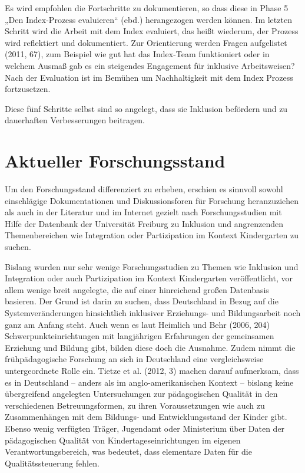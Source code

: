 Es wird empfohlen die Fortschritte zu dokumentieren, so dass diese in Phase 5 „Den Index-Prozess evaluieren“ (ebd.) herangezogen werden können. Im letzten Schritt wird die Arbeit mit dem Index evaluiert, das heißt wiederum, der Prozess wird reflektiert und dokumentiert. Zur Orientierung werden Fragen aufgelistet (2011, 67), zum Beispiel wie gut hat das Index-Team funktioniert oder in welchem Ausmaß gab es ein steigendes Engagement für inklusive Arbeitsweisen? Nach der Evaluation ist im Bemühen um Nachhaltigkeit mit dem Index Prozess fortzusetzen. 
  
Diese fünf Schritte selbst sind so angelegt, dass sie Inklusion befördern und zu dauerhaften Verbesserungen beitragen.

\chapter{Aktueller Forschungsstand}\label{Forschung}
Um den Forschungsstand differenziert zu erheben, erschien es sinnvoll sowohl einschlägige Dokumentationen und Diskussionsforen für Forschung heranzuziehen als auch in der Literatur und im Internet gezielt nach Forschungsstudien mit Hilfe der Datenbank der Universität Freiburg zu Inklusion und angrenzenden Themenbereichen wie Integration oder Partizipation im Kontext Kindergarten zu suchen.

Bislang wurden nur sehr wenige Forschungsstudien zu Themen wie Inklusion und Integration oder auch Partizipation im Kontext Kindergarten veröffentlicht, vor allem wenige breit angelegte, die auf einer hinreichend großen Datenbasis basieren. Der Grund ist darin zu suchen, dass Deutschland in Bezug auf die Systemveränderungen hinsichtlich inklusiver Erziehungs- und Bildungsarbeit noch ganz am Anfang steht. Auch wenn es laut Heimlich und Behr (2006, 204) Schwerpunkteinrichtungen mit langjährigen Erfahrungen der gemeinsamen Erziehung und Bildung gibt, bilden diese doch die Ausnahme.  
Zudem nimmt die frühpädagogische Forschung an sich in Deutschland eine vergleichsweise untergeordnete Rolle ein. 
Tietze et al. (2012, 3) machen darauf aufmerksam, dass es in Deutschland – anders als im anglo-amerikanischen Kontext – bislang keine übergreifend angelegten Untersuchungen zur pädagogischen Qualität in den verschiedenen Betreuungsformen, zu ihren Voraussetzungen wie auch zu Zusammenhängen mit dem Bildungs- und Entwicklungsstand der Kinder gibt. Ebenso wenig verfügten Träger, Jugendamt oder Ministerium über Daten der pädagogischen Qualität von Kindertageseinrichtungen im eigenen Verantwortungsbereich, was bedeutet, dass elementare Daten für die Qualitätssteuerung fehlen.

